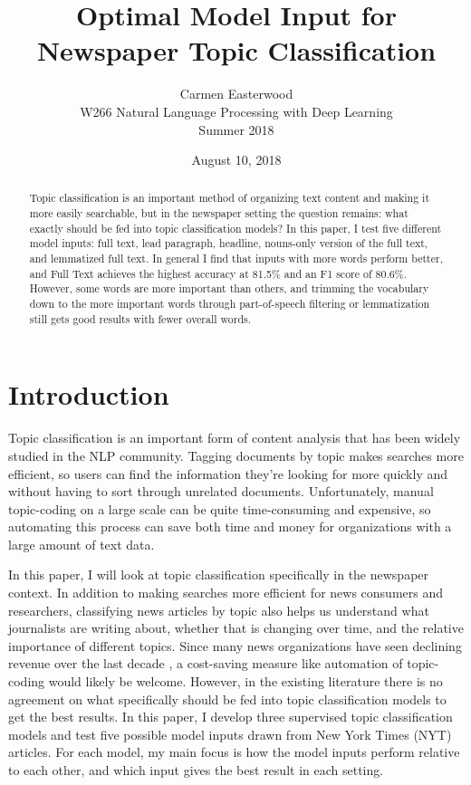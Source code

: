 \documentclass[11pt,a4paper,table]{article}
\title{Optimal Model Input for Newspaper Topic Classification}
\author{Carmen Easterwood \\
  W266 Natural Language Processing with Deep Learning \\
  Summer 2018 \\
}
\date{August 10, 2018}
\begin{document}
\maketitle

\begin{abstract}
Topic classification is an important method of organizing text content and making it more easily searchable, but in the newspaper setting the question remains: what exactly should be fed into topic classification models? In this paper, I test five different model inputs: full text, lead paragraph, headline, nouns-only version of the full text, and lemmatized full text. In general I find that inputs with more words perform better, and Full Text achieves the highest accuracy at 81.5\% and an F1 score of 80.6\%. However, some words are more important than others, and trimming the vocabulary down to the more important words through part-of-speech filtering or lemmatization still gets good results with fewer overall words.
\end{abstract}

\section{Introduction}
\label{sec:intro}

Topic classification is an important form of content analysis that has been widely studied in the NLP community. Tagging documents by topic makes searches more efficient, so users can find the information they're looking for more quickly and without having to sort through unrelated documents. Unfortunately, manual topic-coding on a large scale can be quite time-consuming and expensive, so automating this process can save both time and money for organizations with a large amount of text data.

In this paper, I will look at topic classification specifically in the newspaper context. In addition to making searches more efficient for news consumers and researchers, classifying news articles by topic also helps us understand what journalists are writing about, whether that is changing over time, and the relative importance of different topics. Since many news organizations have seen declining revenue over the last decade \cite{Pew}, a cost-saving measure like automation of topic-coding would likely be welcome. However, in the existing literature there is no agreement on what specifically should be fed into topic classification models to get the best results. In this paper, I develop three supervised topic classification models and test five possible model inputs drawn from New York Times (NYT) articles. For each model, my main focus is how the model inputs perform relative to each other, and which input gives the best result in each setting.
\end{document}
